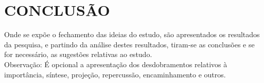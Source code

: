 \chapter{CONCLUSÃO}

Onde se expõe o fechamento das ideias do estudo, são apresentados os resultados
da pesquisa, e partindo da análise destes resultados, tiram-se as conclusões e
se for necessário, as sugestões relativas ao estudo. \\

Observação: É opcional a apresentação dos desdobramentos relativos à
importância, síntese, projeção, repercussão, encaminhamento e outros.